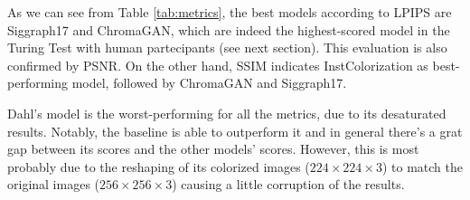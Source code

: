 As we can see from Table \ref{tab:metrics}, the best models according to LPIPS are Siggraph17 and ChromaGAN, which are indeed the highest-scored model in the Turing Test with human partecipants (see next section). This evaluation is also confirmed by PSNR. On the other hand, SSIM indicates InstColorization as best-performing model, followed by ChromaGAN and Siggraph17.

Dahl's model is the worst-performing for all the metrics, due to its desaturated results.
Notably, the baseline is able to outperform it and in general there's a grat gap between its scores and the other models' scores. However, this is most probably due to the reshaping of its colorized images ($224\times224\times3$) to match the original images ($256\times256\times3$) causing a little corruption of the results.


